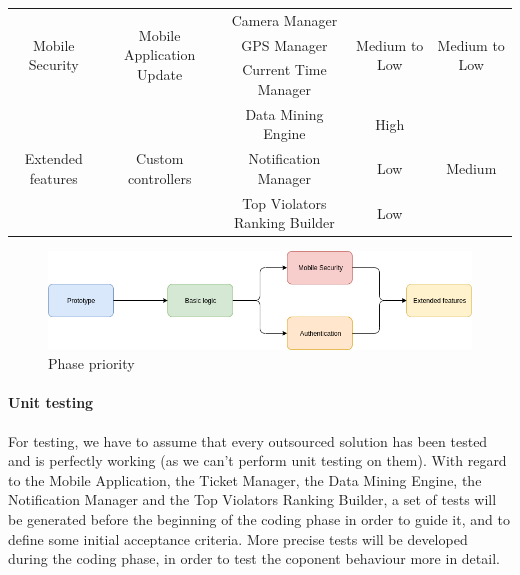 \documentclass{article}
\begin{document}
\begin{table}[h]
\begin{center}
\begin{tabular}{|c|c|c|c|c|}
		\hline		
		\multirow{3}{*}{Mobile Security}		&\multirow{3}{*}{Mobile Application Update}	&Camera Manager		&\multirow{3}{*}{Medium to Low}&\multirow{3}{*}{Medium to Low}\\
											&											&GPS Manager						&				&								\\
											&											&Current Time Manager			&				&								\\
		\hline
		\multirow{3}{*}{Extended features}	&\multirow{3}{*}{Custom controllers}			&Data Mining Engine				&High			&\multirow{3}{*}{Medium}			\\
											&											&Notification Manager			&Low				&								\\
											&											&Top Violators Ranking Builder	&Low				&								\\
		\hline
\end{tabular}
\end{center}
\end{table}

\begin{figure}[h]
\includegraphics[width=\linewidth]{images/Implementation_phases.png}
\caption{Phase priority}
\label{fig:developmentPriorities}
\end{figure}

\paragraph{Unit testing}For testing, we have to assume that every outsourced solution has been tested and is perfectly working (as we can't perform unit testing on them). With regard to the Mobile Application, the Ticket Manager, the Data Mining Engine, the Notification Manager and the Top Violators Ranking Builder, a set of tests will be generated before the beginning of the coding phase in order to guide it, and to define some initial acceptance criteria. More precise tests will be developed during the coding phase, in order to test the coponent behaviour more in detail.
\end{document}
